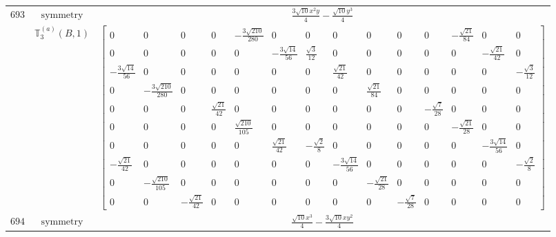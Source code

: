 \documentclass[fleqn,8pt,landscape]{jsarticle}
\begin{document}
\begin{longtable}{ccc}
$ 693 $ & $ \text{symmetry} $ & $ \frac{3 \sqrt{10} x^{2} y}{4} - \frac{\sqrt{10} y^{3}}{4} $ \\
$  $ & $ \mathbb{T}_{3}^{(a)}(B,1) $ & $ \begin{bmatrix} 0 & 0 & 0 & 0 & - \frac{3 \sqrt{210}}{280} & 0 & 0 & 0 & 0 & 0 & 0 & - \frac{\sqrt{21}}{84} & 0 & 0 \\ 0 & 0 & 0 & 0 & 0 & - \frac{3 \sqrt{14}}{56} & \frac{\sqrt{3}}{12} & 0 & 0 & 0 & 0 & 0 & - \frac{\sqrt{21}}{42} & 0 \\ - \frac{3 \sqrt{14}}{56} & 0 & 0 & 0 & 0 & 0 & 0 & \frac{\sqrt{21}}{42} & 0 & 0 & 0 & 0 & 0 & - \frac{\sqrt{3}}{12} \\ 0 & - \frac{3 \sqrt{210}}{280} & 0 & 0 & 0 & 0 & 0 & 0 & \frac{\sqrt{21}}{84} & 0 & 0 & 0 & 0 & 0 \\ 0 & 0 & 0 & \frac{\sqrt{21}}{42} & 0 & 0 & 0 & 0 & 0 & 0 & - \frac{\sqrt{7}}{28} & 0 & 0 & 0 \\ 0 & 0 & 0 & 0 & \frac{\sqrt{210}}{105} & 0 & 0 & 0 & 0 & 0 & 0 & - \frac{\sqrt{21}}{28} & 0 & 0 \\ 0 & 0 & 0 & 0 & 0 & \frac{\sqrt{21}}{42} & - \frac{\sqrt{2}}{8} & 0 & 0 & 0 & 0 & 0 & - \frac{3 \sqrt{14}}{56} & 0 \\ - \frac{\sqrt{21}}{42} & 0 & 0 & 0 & 0 & 0 & 0 & - \frac{3 \sqrt{14}}{56} & 0 & 0 & 0 & 0 & 0 & - \frac{\sqrt{2}}{8} \\ 0 & - \frac{\sqrt{210}}{105} & 0 & 0 & 0 & 0 & 0 & 0 & - \frac{\sqrt{21}}{28} & 0 & 0 & 0 & 0 & 0 \\ 0 & 0 & - \frac{\sqrt{21}}{42} & 0 & 0 & 0 & 0 & 0 & 0 & - \frac{\sqrt{7}}{28} & 0 & 0 & 0 & 0 \end{bmatrix} $ \\ \hline
$ 694 $ & $ \text{symmetry} $ & $ \frac{\sqrt{10} x^{3}}{4} - \frac{3 \sqrt{10} x y^{2}}{4} $ \\

\end{longtable}
\end{document}
